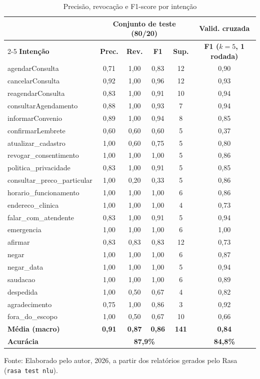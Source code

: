 \documentclass[12pt,a4paper]{extarticle}
\begin{document}
\begin{table}[H]
\centering
\small
\caption{Precisão, revocação e F1-score por intenção}
\label{tab:nlu_intent}
\begin{tabular}{p{4.6cm}ccccc}
\hline
& \multicolumn{4}{c}{\textbf{Conjunto de teste (80/20)}} & \textbf{Valid. cruzada} \\
\cline{2-5}
\textbf{Intenção} & \textbf{Prec.} & \textbf{Rev.} & \textbf{F1} & \textbf{Sup.} & \textbf{F1 ($k=5$, 1 rodada)} \\
\hline
agendarConsulta & 0,71 & 1,00 & 0,83 & 12 & 0,90 \\
cancelarConsulta & 0,92 & 1,00 & 0,96 & 12 & 0,93 \\
reagendarConsulta & 0,83 & 1,00 & 0,91 & 10 & 0,94 \\
consultarAgendamento & 0,88 & 1,00 & 0,93 & 7 & 0,94 \\
informarConvenio & 0,89 & 1,00 & 0,94 & 8 & 0,85 \\
confirmarLembrete & 0,60 & 0,60 & 0,60 & 5 & 0,37 \\
atualizar\_\allowbreak{}cadastro & 1,00 & 0,60 & 0,75 & 5 & 0,80 \\
revogar\_\allowbreak{}consentimento & 1,00 & 1,00 & 1,00 & 5 & 0,86 \\
politica\_\allowbreak{}privacidade & 0,83 & 1,00 & 0,91 & 5 & 0,85 \\
consultar\_\allowbreak{}preco\_\allowbreak{}particular & 1,00 & 0,20 & 0,33 & 5 & 0,86 \\
horario\_\allowbreak{}funcionamento & 1,00 & 1,00 & 1,00 & 6 & 0,86 \\
endereco\_\allowbreak{}clinica & 1,00 & 1,00 & 1,00 & 4 & 0,73 \\
falar\_\allowbreak{}com\_\allowbreak{}atendente & 0,83 & 1,00 & 0,91 & 5 & 0,94 \\
emergencia & 1,00 & 1,00 & 1,00 & 6 & 1,00 \\
afirmar & 0,83 & 0,83 & 0,83 & 12 & 0,73 \\
negar & 1,00 & 1,00 & 1,00 & 6 & 0,87 \\
negar\_\allowbreak{}data & 1,00 & 1,00 & 1,00 & 5 & 0,94 \\
saudacao & 1,00 & 1,00 & 1,00 & 6 & 0,89 \\
despedida & 1,00 & 0,50 & 0,67 & 4 & 0,82 \\
agradecimento & 0,75 & 1,00 & 0,86 & 3 & 0,92 \\
fora\_\allowbreak{}do\_\allowbreak{}escopo & 1,00 & 0,50 & 0,67 & 10 & 0,66 \\
\hline
\textbf{Média (macro)} & \textbf{0,91} & \textbf{0,87} & \textbf{0,86} & \textbf{141} & \textbf{0,84} \\
\textbf{Acurácia} & \multicolumn{4}{c}{\textbf{87,9\%}} & \textbf{84,8\%} \\
\hline
\end{tabular}
\vspace{0.3cm}

\footnotesize{Fonte: Elaborado pelo autor, 2026, a partir dos relatórios gerados pelo Rasa (\texttt{rasa test nlu}).}
\end{table}
\end{document}

